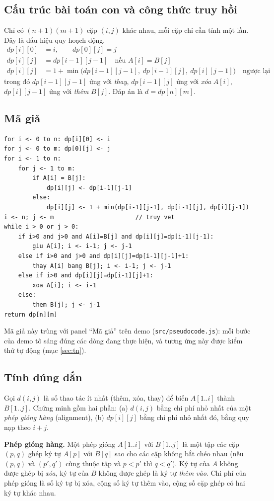 \documentclass[12pt,a4paper]{article}
\newcommand{\code}[1]{\texttt{#1}}
\begin{document}
\subsection{Cấu trúc bài toán con và công thức truy hồi}
Chỉ có $(n+1)(m+1)$ cặp $(i,j)$ khác nhau, mỗi cặp chỉ cần tính một lần. Đây là dấu hiệu quy hoạch động.
\begin{align*}
dp[i][0] &= i, \qquad dp[0][j] = j\\
dp[i][j] &= dp[i-1][j-1] \quad\text{nếu } A[i]=B[j]\\
dp[i][j] &= 1+\min\bigl(dp[i-1][j-1],\ dp[i-1][j],\ dp[i][j-1]\bigr) \quad\text{ngược lại}
\end{align*}
trong đó $dp[i-1][j-1]$ ứng với \emph{thay}, $dp[i-1][j]$ ứng với \emph{xóa} $A[i]$, $dp[i][j-1]$ ứng với \emph{thêm} $B[j]$. Đáp án là $d=dp[n][m]$.

\subsection{Mã giả}
\begin{lstlisting}
for i <- 0 to n: dp[i][0] <- i
for j <- 0 to m: dp[0][j] <- j
for i <- 1 to n:
    for j <- 1 to m:
        if A[i] = B[j]:
            dp[i][j] <- dp[i-1][j-1]
        else:
            dp[i][j] <- 1 + min(dp[i-1][j-1], dp[i-1][j], dp[i][j-1])
i <- n; j <- m                       // truy vet
while i > 0 or j > 0:
    if i>0 and j>0 and A[i]=B[j] and dp[i][j]=dp[i-1][j-1]:
        giu A[i]; i <- i-1; j <- j-1
    else if i>0 and j>0 and dp[i][j]=dp[i-1][j-1]+1:
        thay A[i] bang B[j]; i <- i-1; j <- j-1
    else if i>0 and dp[i][j]=dp[i-1][j]+1:
        xoa A[i]; i <- i-1
    else:
        them B[j]; j <- j-1
return dp[n][m]
\end{lstlisting}
Mã giả này trùng với panel ``Mã giả'' trên demo (\code{src/pseudocode.js}): mỗi bước của demo tô sáng đúng các dòng đang thực hiện, và tương ứng này được kiểm thử tự động (mục \ref{sec:tn}).

\subsection{Tính đúng đắn}

Gọi $d(i,j)$ là số thao tác ít nhất (thêm, xóa, thay) để biến $A[1..i]$ thành $B[1..j]$. Chứng minh gồm hai phần: (a) $d(i,j)$ bằng chi phí nhỏ nhất của một \emph{phép gióng hàng} (alignment), (b) $dp[i][j]$ bằng chi phí nhỏ nhất đó, bằng quy nạp theo $i+j$.

\textbf{Phép gióng hàng.} Một phép gióng $A[1..i]$ với $B[1..j]$ là một tập các cặp $(p,q)$ ghép ký tự $A[p]$ với $B[q]$ sao cho các cặp không bắt chéo nhau (nếu $(p,q)$ và $(p',q')$ cùng thuộc tập và $p<p'$ thì $q<q'$). Ký tự của $A$ không được ghép bị \emph{xóa}, ký tự của $B$ không được ghép là ký tự \emph{thêm vào}. Chi phí của phép gióng là số ký tự bị xóa, cộng số ký tự thêm vào, cộng số cặp ghép có hai ký tự khác nhau.
\end{document}
